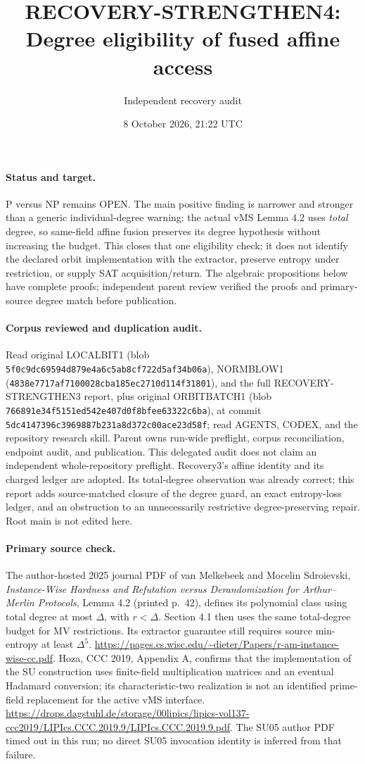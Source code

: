 \documentclass[11pt]{article}
\title{RECOVERY-STRENGTHEN4: Degree eligibility of fused affine access}
\author{Independent recovery audit}
\date{8 October 2026, 21:22 UTC}
\begin{document}
\maketitle
\paragraph{Status and target.}
P versus NP remains OPEN. The main positive finding is narrower and stronger
than a generic individual-degree warning: the actual vMS Lemma 4.2 uses
\emph{total} degree, so same-field affine fusion preserves its degree
hypothesis without increasing the budget. This closes that one eligibility
check; it does not identify the declared orbit implementation with the
extractor, preserve entropy under restriction, or supply SAT acquisition/return.
The algebraic propositions below have complete proofs; independent parent
review verified the proofs and primary-source degree match before publication.

\paragraph{Corpus reviewed and duplication audit.}
Read original LOCALBIT1 (blob
\nolinkurl{5f0c9dc69594d879e4a6c5ab8cf722d5af34b06a}), NORMBLOW1
(\nolinkurl{4838e7717af7100028cba185ec2710d114f31801}), and the full
RECOVERY-STRENGTHEN3 report, plus original ORBITBATCH1 (blob
\nolinkurl{766891e34f5151ed542e407d0f8bfee63322c6ba}), at commit
\nolinkurl{5dc4147396c3969887b231a8d372c00ace23d58f}; read AGENTS,
CODEX, and the repository research skill. Parent owns run-wide preflight,
corpus reconciliation, endpoint audit, and publication. This delegated audit
does not claim an independent whole-repository preflight. Recovery3's affine
identity and its charged ledger are adopted. Its total-degree observation
was already correct; this report adds source-matched closure of the degree
guard, an exact entropy-loss ledger, and an obstruction to an unnecessarily
restrictive degree-preserving repair. Root main is not edited here.

\paragraph{Primary source check.}
The author-hosted 2025 journal PDF of van Melkebeek and Mocelin Sdroievski,
\emph{Instance-Wise Hardness and Refutation versus Derandomization for
Arthur--Merlin Protocols}, Lemma 4.2 (printed p.~42), defines its polynomial
class using total degree at most $\Delta$, with $r<\Delta$. Section 4.1
then uses the same total-degree budget for MV restrictions. Its extractor
guarantee still requires source min-entropy at least $\Delta^5$.
\url{https://pages.cs.wisc.edu/~dieter/Papers/r-am-instance-wise-cc.pdf}.
Hoza, CCC 2019, Appendix A, confirms that the implementation of the SU
construction uses finite-field multiplication matrices and an eventual
Hadamard conversion; its characteristic-two realization is not an
identified prime-field replacement for the active vMS interface.
\url{https://drops.dagstuhl.de/storage/00lipics/lipics-vol137-ccc2019/LIPIcs.CCC.2019.9/LIPIcs.CCC.2019.9.pdf}.
The SU05 author PDF timed out in this run; no direct SU05 invocation identity
is inferred from that failure.
\end{document}
